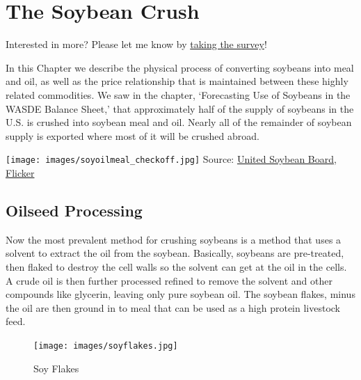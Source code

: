 \documentclass[
  letterpaper,
  DIV=11,
  numbers=noendperiod]{scrreprt}
\begin{document}

\hypertarget{the-soybean-crush}{%
\chapter{The Soybean Crush}\label{the-soybean-crush}}

{Interested in more? Please let me know by}
\href{https://forms.gle/Q3VByCQZHjfQSy9D7}{taking the survey}!

In this Chapter we describe the physical process of converting soybeans
into meal and oil, as well as the price relationship that is maintained
between these highly related commodities. We saw in the chapter,
`Forecasting Use of Soybeans in the WASDE Balance Sheet,' that
approximately half of the supply of soybeans in the U.S. is crushed into
soybean meal and oil. Nearly all of the remainder of soybean supply is
exported where most of it will be crushed abroad.

\texttt{[image: images/soyoilmeal\_checkoff.jpg]} Source:
\href{http://unitedsoybean.org/}{United Soybean Board},
\href{https://www.flickr.com/photos/unitedsoybean/10059732523/in/photolist-gjWL1c-iSHsD6-gjRZN5-gjSiez-gjRDSm-3GTus-gjT5Pf-gjT5FQ-gjT5Zf-iRrGux-5mxrJp-iRuCDS-fEhEb4-iSHt56-gjSLAj-gjTptX-gjSLDL-gjSNeR-gjSLEC-gjT72q-6m2BCX-gjSUHT-gjTpzi-6m6Jay-qBtpPq-5wBq3U-gjWLbe-aMpXNc-qRDdLA-gjWY8m-rujuvk-iRqECD-rNDaeg-GL7Qd-6m2Yyc-6JGi4H-ar3khU-cNjfUf-6m2A3g-aE4dw4-c3VUt9-c3VVq5-4JzMWS-6KY45z-6m2Xsv-6m6Eny-6m2XZg-6m2WVa-6m2ZFF-6m7ad1}{Flicker}

\hypertarget{oilseed-processing}{%
\section{Oilseed Processing}\label{oilseed-processing}}

Now the most prevalent method for crushing soybeans is a method that
uses a solvent to extract the oil from the soybean. Basically, soybeans
are pre-treated, then flaked to destroy the cell walls so the solvent
can get at the oil in the cells. A crude oil is then further processed
refined to remove the solvent and other compounds like glycerin, leaving
only pure soybean oil. The soybean flakes, minus the oil are then ground
in to meal that can be used as a high protein livestock feed.

\begin{figure}

{\centering \texttt{[image: images/soyflakes.jpg]}

}

\caption{Soy Flakes}

\end{figure}
\end{document}
